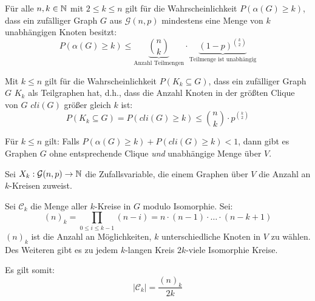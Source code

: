 \begin{lemma}
    \label{lem:independent-prob}
    Für alle $ n, k \in \mathbb{N} $ mit $ 2 \leq k \leq n $ gilt für die Wahrscheinlichkeit $ P(\alpha(G) \geq k) $, dass ein zufälliger Graph $ G $ aus $ \mathcal{G}(n, p) $ mindestens eine Menge von $ k $ unabhängigen Knoten besitzt:
    \begin{equation*}
        P(\alpha(G) \geq k) \leq \underbrace{\binom{n}{k}}_{\text{Anzahl Teilmengen}} \cdot \underbrace{(1 - p)^{\binom{k}{2}}}_{\text{Teilmenge ist unabhängig}}
    \end{equation*}
\end{lemma}

\begin{lemma}
    Mit $ k \leq n $ gilt für die Wahrscheinlichkeit $ P(K_k \subseteq G) $, dass ein zufälliger Graph $ G $ $ K_k $ als Teilgraphen hat, d.h., dass die Anzahl Knoten in der größten Clique von $ G $ $ cli(G) $ größer gleich $ k $ ist:
    \begin{equation*}
        P(K_k \subseteq G) = P(cli(G) \geq k) \leq \binom{n}{k} \cdot p^{\binom{k}{2}}
    \end{equation*}
\end{lemma}

\begin{lemma}
    Für $ k \leq n $ gilt: Falls $ P(\alpha(G) \geq k) + P(cli(G) \geq k) < 1 $, dann gibt es Graphen $ G $ ohne entsprechende Clique \textit{und} unabhängige Menge über $ V $.
\end{lemma}

\begin{definition}
    Sei $ X_k : \mathcal{G}(n, p) \rightarrow \mathbb{N} $ die Zufallsvariable, die einem Graphen über $ V $ die Anzahl an $ k $-Kreisen zuweist.
\end{definition}

\begin{proposition}
    Sei $ \mathcal{C}_k $ die Menge aller $ k $-Kreise in $ G $ modulo Isomorphie.
    Sei:
    \begin{equation*}
        (n)_k = \prod_{0 \leq i \leq k - 1} (n - i) = n \cdot (n - 1) \cdot \dots \cdot (n - k + 1)
    \end{equation*}
    $ (n)_k $ ist die Anzahl an Möglichkeiten, $ k $ unterschiedliche Knoten in $ V $ zu wählen.
    Des Weiteren gibt es zu jedem $ k $-langen Kreis $ 2k $-viele Isomorphie Kreise.

    Es gilt somit:
    \begin{equation*}
        |\mathcal{C}_k| = \frac{(n)_k}{2k}
    \end{equation*}
\end{proposition}

